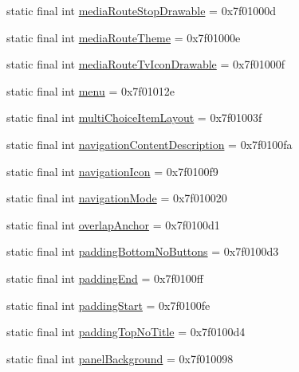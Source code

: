 \begin{CompactItemize}
\item 
static final int \hyperlink{classandroid_1_1support_1_1mediacompat_1_1_r_1_1attr_9b04ce847401a35fdcc5b077ce9155f7}{mediaRouteStopDrawable} = 0x7f01000d
\item 
static final int \hyperlink{classandroid_1_1support_1_1mediacompat_1_1_r_1_1attr_94ce75f9b5469d7c54888e6a6da97bde}{mediaRouteTheme} = 0x7f01000e
\item 
static final int \hyperlink{classandroid_1_1support_1_1mediacompat_1_1_r_1_1attr_d83242917548febc3840d0bbd9f4b3d6}{mediaRouteTvIconDrawable} = 0x7f01000f
\item 
static final int \hyperlink{classandroid_1_1support_1_1mediacompat_1_1_r_1_1attr_16f5f44327cff39ed806266302622585}{menu} = 0x7f01012e
\item 
static final int \hyperlink{classandroid_1_1support_1_1mediacompat_1_1_r_1_1attr_f1830e655813e8094bbb5a7dd35fb365}{multiChoiceItemLayout} = 0x7f01003f
\item 
static final int \hyperlink{classandroid_1_1support_1_1mediacompat_1_1_r_1_1attr_8fb8a0a7c6e3e2f9e2ce4736ace0dfa5}{navigationContentDescription} = 0x7f0100fa
\item 
static final int \hyperlink{classandroid_1_1support_1_1mediacompat_1_1_r_1_1attr_9ce0d05b0f8e92912905c0c8499046af}{navigationIcon} = 0x7f0100f9
\item 
static final int \hyperlink{classandroid_1_1support_1_1mediacompat_1_1_r_1_1attr_11b4f9a91a73463a812547590b274695}{navigationMode} = 0x7f010020
\item 
static final int \hyperlink{classandroid_1_1support_1_1mediacompat_1_1_r_1_1attr_53ac0e21565c3c92840c73f4f667ccc7}{overlapAnchor} = 0x7f0100d1
\item 
static final int \hyperlink{classandroid_1_1support_1_1mediacompat_1_1_r_1_1attr_4172889e2abdc55bb4fd118c1c3e4849}{paddingBottomNoButtons} = 0x7f0100d3
\item 
static final int \hyperlink{classandroid_1_1support_1_1mediacompat_1_1_r_1_1attr_426ecad19dec8def7865805e69b2c1c1}{paddingEnd} = 0x7f0100ff
\item 
static final int \hyperlink{classandroid_1_1support_1_1mediacompat_1_1_r_1_1attr_2d297223ce0706306ce42d7ce3790bd6}{paddingStart} = 0x7f0100fe
\item 
static final int \hyperlink{classandroid_1_1support_1_1mediacompat_1_1_r_1_1attr_ed0fe7aa54c49c55d864979cd4ee4826}{paddingTopNoTitle} = 0x7f0100d4
\item 
static final int \hyperlink{classandroid_1_1support_1_1mediacompat_1_1_r_1_1attr_913f034101e4a0cdf7cd66b3637c6337}{panelBackground} = 0x7f010098

\end{CompactItemize}
